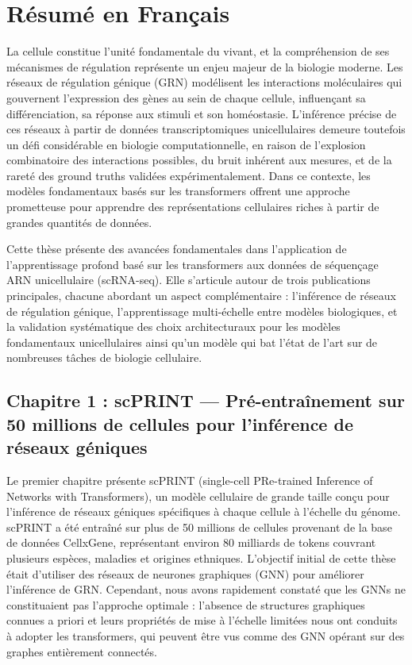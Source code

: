 \raggedbottom %

\chapter*{Résumé en Français} %

La cellule constitue l'unité fondamentale du vivant, et la compréhension de ses mécanismes de régulation représente un enjeu majeur de la biologie moderne. Les réseaux de régulation génique (GRN) modélisent les interactions moléculaires qui gouvernent l'expression des gènes au sein de chaque cellule, influençant sa différenciation, sa réponse aux stimuli et son homéostasie. L'inférence précise de ces réseaux à partir de données transcriptomiques unicellulaires demeure toutefois un défi considérable en biologie computationnelle, en raison de l'explosion combinatoire des interactions possibles, du bruit inhérent aux mesures, et de la rareté des ground truths validées expérimentalement. Dans ce contexte, les modèles fondamentaux basés sur les transformers offrent une approche prometteuse pour apprendre des représentations cellulaires riches à partir de grandes quantités de données.

Cette thèse présente des avancées fondamentales dans l'application de l'apprentissage profond basé sur les transformers aux données de séquençage ARN unicellulaire (scRNA-seq). Elle s'articule autour de trois publications principales, chacune abordant un aspect complémentaire : l'inférence de réseaux de régulation génique, l'apprentissage multi-échelle entre modèles biologiques, et la validation systématique des choix architecturaux pour les modèles fondamentaux unicellulaires ainsi qu'un modèle qui bat l'état de l'art sur de nombreuses tâches de biologie cellulaire.

\section*{Chapitre 1 : scPRINT — Pré-entraînement sur 50 millions de cellules pour l'inférence de réseaux géniques}

Le premier chapitre présente scPRINT (single-cell PRe-trained Inference of Networks with Transformers), un modèle cellulaire de grande taille conçu pour l'inférence de réseaux géniques spécifiques à chaque cellule à l'échelle du génome. scPRINT a été entraîné sur plus de 50 millions de cellules provenant de la base de données CellxGene, représentant environ 80 milliards de tokens couvrant plusieurs espèces, maladies et origines ethniques. L'objectif initial de cette thèse était d'utiliser des réseaux de neurones graphiques (GNN) pour améliorer l'inférence de GRN. Cependant, nous avons rapidement constaté que les GNNs ne constituaient pas l'approche optimale : l'absence de structures graphiques connues a priori et leurs propriétés de mise à l'échelle limitées nous ont conduits à adopter les transformers, qui peuvent être vus comme des GNN opérant sur des graphes entièrement connectés.

